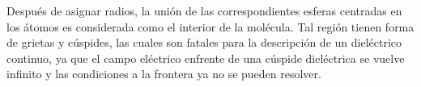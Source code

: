 Despu\'es de asignar radios, la uni\'on de las correspondientes
esferas centradas en los \'atomos es considerada como el interior de
la mol\'ecula. Tal regi\'on tienen forma de grietas y c\'uspides, las
cuales son fatales para la descripci\'on de un diel\'ectrico 
continuo, ya que el campo el\'ectrico enfrente de una c\'uspide
diel\'ectrica se vuelve infinito y las condiciones a la frontera ya 
no se pueden resolver.
